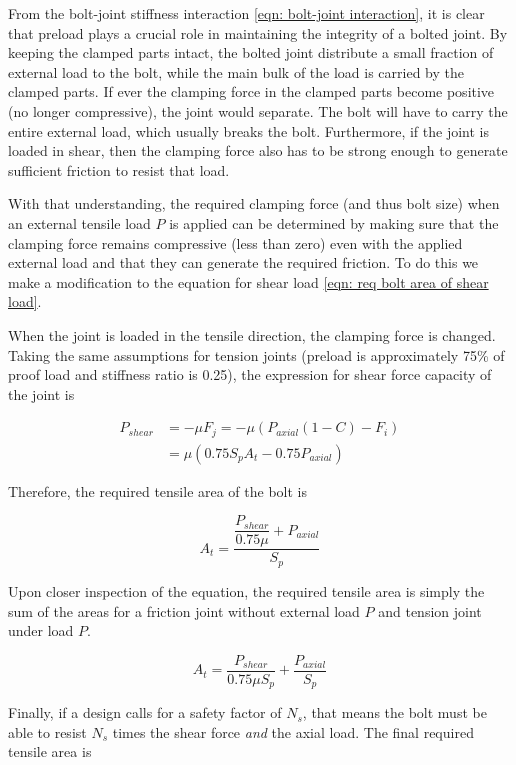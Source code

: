 \documentclass[
10pt,
a4paper,
openany,
svgnames,
]{book}
\begin{document}
From the bolt-joint stiffness interaction \cref{eqn: bolt-joint interaction}, it is clear that preload plays a crucial role in maintaining the integrity of a bolted joint. By keeping the clamped parts intact, the bolted joint distribute a small fraction of external load to the bolt, while the main bulk of the load is carried by the clamped parts. If ever the clamping force in the clamped parts become positive (no longer compressive), the joint would separate. The bolt will have to carry the entire external load, which usually breaks the bolt. Furthermore, if the joint is loaded in shear, then the clamping force also has to be strong enough to generate sufficient friction to resist that load.

With that understanding, the required clamping force (and thus bolt size) when an external tensile load $P$ is applied can be determined by making sure that the clamping force remains compressive (less than zero) even with the applied external load and that they can generate the required friction. To do this we make a modification to the equation for shear load \cref{eqn: req bolt area of shear load}. 

When the joint is loaded in the tensile direction, the clamping force is changed. Taking the same assumptions for tension joints (preload is approximately 75\% of proof load and stiffness ratio is 0.25), the expression for shear force capacity of the joint is 
 
\begin{align*}
  P_{shear} &= -\mu F_j = -\mu \left( P_{axial}(1 - C) - F_i \right) \\
            &= \mu (0.75S_pA_t - 0.75P_{axial})
\end{align*}

Therefore, the required tensile area of the bolt is

\begin{equation}
  A_t = \frac{\dfrac{P_{shear}}{0.75\mu } + P_{axial}}{S_p}
\end{equation}

Upon closer inspection of the equation, the required tensile area is simply the sum of the areas for a friction joint without external load $P$ and tension joint under load $P$.

\begin{equation}
  A_t = \frac{P_{shear}}{0.75\mu S_p } + \frac{P_{axial}}{S_p}
\end{equation} 

Finally, if a design calls for a safety factor of $N_s$, that means the bolt must be able to resist $N_s$ times the shear force \emph{and} the axial load. The final required tensile area is
\end{document}
